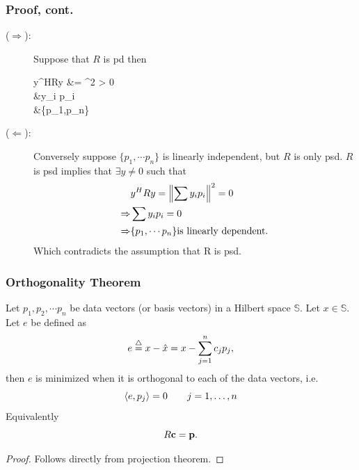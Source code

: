 \documentclass{beamer}
\begin{document}
\begin{frame}\frametitle{Proof, cont.}
\begin{description}
\item[($\Rightarrow$):]
	Suppose that $R$ is pd then
	\begin{flalign*}
	y^HRy &= ^2 > 0\\
	&\Rightarrow \sum y_i p_i  \\
	&\Rightarrow \{p_1,\cdots p_n\} 
	\end{flalign*}

\item[($\Leftarrow$):]	
	Conversely suppose $\{p_1, \cdots p_n\}$ is linearly independent, but
	$R$ is only psd.  $R$ is psd implies that $\exists y \neq 0$ such that 
	\begin{align*} 
		& y^HRy = \left\| \sum y_ip_i \right\|^2 = 0 \\
		\Rightarrow & \sum y_ip_i = 0 \\ 
		\Rightarrow & \{p_1, \cdots p_n\} \text{is linearly dependent.}
	\end{align*}
	Which contradicts the assumption that R is psd.
\end{description}
\end{frame}

\begin{frame}\frametitle{Orthogonality Theorem}
	\begin{theorem}	
	Let $p_1,p_2, \cdots p_n $ be data vectors (or basis vectors) in a
	Hilbert space $\mathbb{S}$.  Let $x \in \mathbb{S}$.  Let $e$ be defined as
	\[ e \stackrel{\triangle}{=} x - \hat{x} = x - \sum_{j=1}^n c_j p_j,\]
	then $e$ is minimized when it is orthogonal to each of the data
	vectors, i.e.
	\[ \left< e, p_j\right> = 0 \qquad j=1,\ldots, n \]
	Equivalently
	\[
	R\mathbf{c} = \mathbf{p}.
	\]
	\end{theorem}
	\begin{proof}
		Follows directly from projection theorem.
	\end{proof}
\end{frame}
\end{document}

